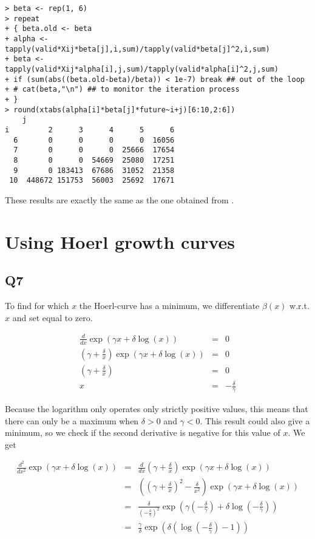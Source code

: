 \documentclass[11pt]{article}
\begin{document}
\begin{verbatim}
> beta <- rep(1, 6)
> repeat
+ { beta.old <- beta
+ alpha <- tapply(valid*Xij*beta[j],i,sum)/tapply(valid*beta[j]^2,i,sum)
+ beta <- tapply(valid*Xij*alpha[i],j,sum)/tapply(valid*alpha[i]^2,j,sum)
+ if (sum(abs((beta.old-beta)/beta)) < 1e-7) break ## out of the loop
+ # cat(beta,"\n") ## to monitor the iteration process
+ }
> round(xtabs(alpha[i]*beta[j]*future~i+j)[6:10,2:6])
    j
i         2      3      4      5      6
  6       0      0      0      0  16056
  7       0      0      0  25666  17654
  8       0      0  54669  25080  17251
  9       0 183413  67686  31052  21358
 10  448672 151753  56003  25692  17671
\end{verbatim}

These results are exactly the same as the one obtained from .

\section{Using Hoerl growth curves}

\subsection*{Q7}

To find for which $x$ the Hoerl-curve has a minimum, we differentiate $\beta(x)$ w.r.t. $x$ and set equal to zero.

\begin{eqnarray}
\frac{d}{dx} \exp(\gamma x + \delta \log(x)) &=& 0 \\
(\gamma + \frac{\delta}{x})\exp(\gamma x + \delta \log(x)) &=& 0 \\ 
(\gamma + \frac{\delta}{x}) &=& 0 \\
x &=& -\frac{\delta}{\gamma}
\end{eqnarray}

Because the logarithm only operates only strictly positive values, this means that there can only be a maximum when $\delta > 0$ and $\gamma < 0$. This result could also give a minimum, so we check if the second derivative is negative for this value of $x$. We get

\begin{eqnarray}
\frac{d^2}{dx^2} \exp(\gamma x + \delta \log(x)) &=& \frac{d}{dx} (\gamma + \frac{\delta}{x})\exp(\gamma x + \delta \log(x)) \\
&=& ((\gamma + \frac{\delta}{x})^{2} - \frac{\delta}{x^{2}}) \exp(\gamma x + \delta \log(x)) \\
&=& \frac{\delta}{(-\frac{\delta}{\gamma})^{2}} \exp(\gamma (-\frac{\delta}{\gamma}) + \delta \log(-\frac{\delta}{\gamma})) \\
&=& \frac{\gamma}{\delta} \exp(\delta( \log(-\frac{\delta}{\gamma})-1))
\end{eqnarray}
\end{document}

